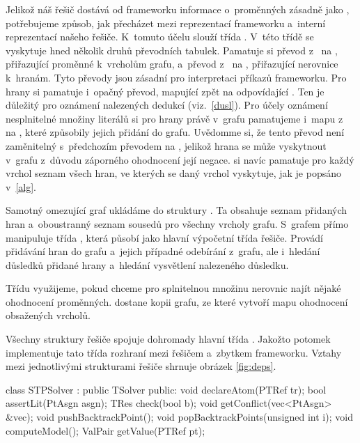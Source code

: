 Jelikož náš řešič dostává od frameworku informace o~proměnných zásadně jako , potřebujeme způsob, jak přecházet mezi reprezentací frameworku a~interní reprezentací našeho řešiče. K~tomuto účelu slouží třída . V~této třídě se vyskytuje hned několik druhů převodních tabulek. Pamatuje si převod z~ na , přiřazující proměnné k~vrcholům grafu, a~převod z~ na , přiřazující nerovnice k~hranám. Tyto převody jsou zásadní pro interpretaci příkazů frameworku. Pro hrany si pamatuje i~opačný převod, mapující  zpět na odpovídající . Ten je důležitý pro oznámení nalezených dedukcí (viz.~\ref{dusl}). Pro účely oznámení nesplnitelné množiny literálů si pro hrany právě v~grafu pamatujeme i~mapu z~ na , které způsobily jejich přidání do grafu. Uvědomme si, že tento převod není zaměnitelný s~předchozím převodem na , jelikož hrana se může vyskytnout v~grafu z~důvodu záporného ohodnocení její negace.  si navíc pamatuje pro každý vrchol seznam všech hran, ve kterých se daný vrchol vyskytuje, jak je popsáno v~\ref{alg}.

Samotný omezující graf ukládáme do struktury . Ta obsahuje seznam přidaných hran a~oboustranný seznam sousedů pro všechny vrcholy grafu. S~grafem přímo manipuluje třída , která působí jako hlavní výpočetní třída řešiče. Provádí přidávání hran do grafu a~jejich případné odebírání z~grafu, ale i~hledání důsledků přidané hrany a~hledání vysvětlení nalezeného důsledku.

Třídu  využijeme, pokud chceme pro splnitelnou množinu nerovnic najít nějaké ohodnocení proměnných.  dostane kopii grafu, ze které vytvoří mapu ohodnocení obsažených vrcholů.

Všechny struktury řešiče spojuje dohromady hlavní třída . Jakožto potomek  implementuje tato třída rozhraní mezi řešičem a~zbytkem frameworku. Vztahy mezi jednotlivými strukturami řešiče shrnuje obrázek \ref{fig:deps}.
\begin{code}[labelposition=bottomline,label=Základní API třídy STPSolver]
class STPSolver : public TSolver {
public:
	void declareAtom(PTRef tr);
	bool assertLit(PtAsgn asgn);
	TRes check(bool b);
	void getConflict(vec<PtAsgn> &vec);
	void pushBacktrackPoint();
	void popBacktrackPoints(unsigned int i);
	void computeModel();
	ValPair getValue(PTRef pt);
}
\end{code}

